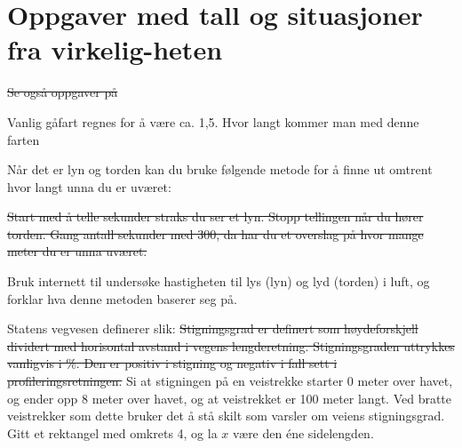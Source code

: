 




\section{Oppgaver med tall og situasjoner fra virkelig-heten}	
\st{Se også oppgaver på }

Vanlig gåfart regnes for å være ca. 1,5. Hvor langt kommer man med denne farten
	
Når det er lyn og torden kan du bruke følgende metode for å finne ut omtrent hvor langt unna du er uværet:\os

\st{Start med å telle sekunder straks du ser et lyn. Stopp tellingen når du hører torden. Gang antall sekunder med 300, da har du et overslag på hvor mange meter du er unna uværet.}

Bruk internett til undersøke hastigheten til lys (lyn) og lyd (torden) i luft, og forklar hva denne metoden baserer seg på.

Statens vegvesen definerer  slik:
\st{
Stigningsgrad er definert som høydeforskjell dividert med horisontal avstand i vegens lengderetning.
Stigningsgraden uttrykkes vanligvis i \%. Den er positiv i stigning og negativ i fall sett i
profileringsretningen.
}
Si at stigningen på en veistrekke starter 0 meter over havet, og ender opp 8 meter over havet, og at veistrekket er 100 meter langt. Ved bratte veistrekker som dette bruker det å stå skilt som varsler om veiens stigningsgrad.
 \newpage
{} 
Gitt et rektangel med omkrets 4, og la $ x $ være den éne sidelengden.

